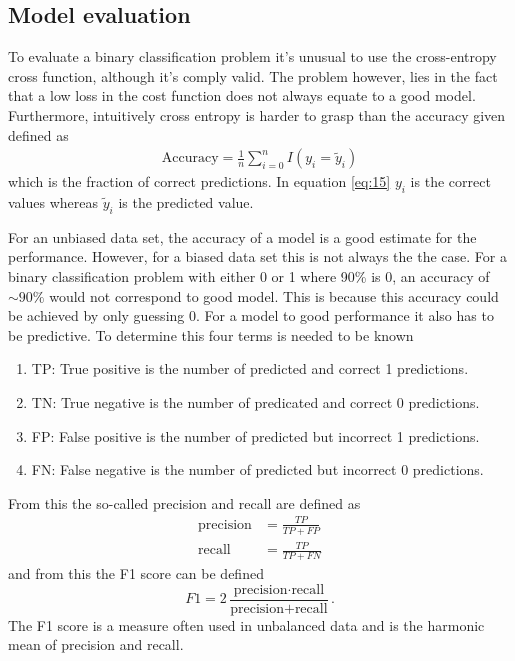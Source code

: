\documentclass[uio,jmp,amsmath,amssymb,reprint,nofootinbib]{revtex4-1}
\numberwithin{equation}{section}
\begin{document}
\subsection{Model evaluation}

To evaluate a binary classification problem it's unusual to use the cross-entropy cross function, although it's comply valid. The problem however, lies in the fact that a low loss in the cost function does not always equate to a good model. Furthermore, intuitively cross entropy is harder to grasp than the accuracy given defined as
\begin{align}\label{eq:15}
\text{Accuracy} = \frac{1}{n}\sum_{i=0}^nI(y_i = \tilde{y}_i)
\end{align}
which is the fraction of correct predictions. In equation \ref{eq:15} \(y_i\) is the correct values whereas \(\tilde{y}_i\) is the predicted value.

For an unbiased data set, the accuracy of a model is a good estimate for the performance. However, for a biased data set this is not always the the case. For a binary classification problem with either 0 or 1 where 90\% is 0, an accuracy of \(\sim 90\%\) would not correspond to good model. This is because this accuracy could be achieved by only guessing 0. For a model to good performance it also has to be predictive. To determine this four terms is needed to be known\cite{wiki:F1_score}
\begin{enumerate}
\item TP: True positive is the number of predicted and correct 1 predictions.
\item TN: True negative is the number of  predicated and correct 0 predictions.
\item FP: False positive is the number of  predicted but incorrect 1 predictions.
\item FN: False negative is the number of  predicted but incorrect 0 predictions.
\end{enumerate}
From this the so-called precision and recall are defined as
\begin{align}
\text{precision} &= \frac{TP}{TP + FP}\\
\text{recall} &= \frac{TP}{TP + FN}
\end{align}
and from this the F1 score can be defined
\begin{equation}
F1 = 2\frac{\text{precision}\cdot \text{recall}}{\text{precision} + \text{recall}}.
\end{equation}
The F1 score is a measure often used in unbalanced data and is the harmonic mean of precision and recall\cite{wiki:F1_score}.
\end{document}

